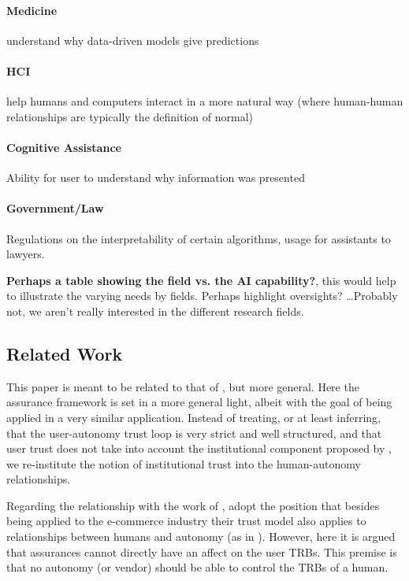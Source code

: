     \paragraph{Medicine} understand why data-driven models give predictions
    \paragraph{HCI} help humans and computers interact in a more natural way (where human-human relationships are typically the definition of normal)
    \paragraph{Cognitive Assistance} Ability for user to understand why information was presented
    \paragraph{Government/Law} Regulations on the interpretability of certain algorithms, usage for assistants to lawyers.

    \textbf{Perhaps a table showing the field vs. the AI capability?}, this would help to illustrate the varying needs by fields. Perhaps highlight oversights? \ldots Probably not, we aren't really interested in the different research fields.

\subsection{Related Work}
    This paper is meant to be related to that of \citet{Lillard2016-yg}, but more general. Here the assurance framework is set in a more general light, albeit with the goal of being applied in a very similar application. Instead of treating, or at least inferring, that the user-autonomy trust loop is very strict and well structured, and that user trust does not take into account the institutional component proposed by \citet{McKnight2001-fa}, we re-institute the notion of institutional trust into the human-autonomy relationships.

    Regarding the relationship with the work of \citet{McKnight2001-fa}, adopt the position that besides being applied to the e-commerce industry their trust model also applies to relationships between humans and autonomy (as in \citet{Lillard2016-yg}). However, here it is argued that assurances cannot directly have an affect on the user TRBs. This premise is that no autonomy (or vendor) should be able to control the TRBs of a human.





